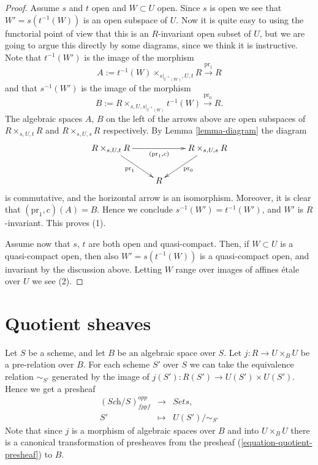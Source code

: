 \begin{proof}
Assume $s$ and $t$ open and $W \subset U$ open.
Since $s$ is open we see that $W' = s(t^{-1}(W))$ is an open subspace of $U$.
Now it is quite easy to using the functorial point of view
that this is an $R$-invariant open subset of $U$, but we are going to argue
this directly by some diagrams, since we think it is instructive.
Note that $t^{-1}(W')$ is the image of the morphism
$$
A := t^{-1}(W) \times_{s|_{t^{-1}(W)}, U, t} R
\xrightarrow{\text{pr}_1} R
$$
and that $s^{-1}(W')$ is the image of the morphism
$$
B := R \times_{s, U, s|_{t^{-1}(W)}} t^{-1}(W)
\xrightarrow{\text{pr}_0} R.
$$
The algebraic spaces $A$, $B$
on the left of the arrows above are open subspaces of
$R \times_{s, U, t} R$ and $R \times_{s, U, s} R$ respectively.
By Lemma \ref{lemma-diagram} the diagram
$$
\xymatrix{
R \times_{s, U, t} R \ar[rd]_{\text{pr}_1} \ar[rr]_{(\text{pr}_1, c)} & &
R \times_{s, U, s} R \ar[ld]^{\text{pr}_0} \\
& R &
}
$$
is commutative, and the horizontal arrow is an isomorphism. Moreover, it is
clear that $(\text{pr}_1, c)(A) = B$. Hence we conclude
$s^{-1}(W') = t^{-1}(W')$, and $W'$ is $R$-invariant. This proves (1).

\medskip\noindent
Assume now that $s$, $t$ are both open and quasi-compact.
Then, if $W \subset U$ is a quasi-compact open, then also
$W' = s(t^{-1}(W))$ is a quasi-compact open, and invariant by the
discussion above. Letting $W$ range over images of affines \'etale over $U$
we see (2).
\end{proof}





\section{Quotient sheaves}
\label{section-quotient-sheaves}

\noindent
Let $S$ be a scheme, and let $B$ be an algebraic space over $S$.
Let $j : R \to U \times_B U$ be a pre-relation over $B$.
For each scheme $S'$ over $S$ we can take the equivalence relation
$\sim_{S'}$ generated by the image of $j(S') : R(S') \to U(S') \times U(S')$.
Hence we get a presheaf
\begin{equation}
\label{equation-quotient-presheaf}
\begin{matrix}
(\textit{Sch}/S)^{opp}_{fppf} &
\longrightarrow &
\textit{Sets}, \\
S' &
\longmapsto  &
U(S')/\sim_{S'}
\end{matrix}
\end{equation}
Note that since $j$ is a morphism of algebraic spaces over $B$
and into $U \times_B U$ there is a canonical transformation of
presheaves from the presheaf (\ref{equation-quotient-presheaf}) to $B$. 

